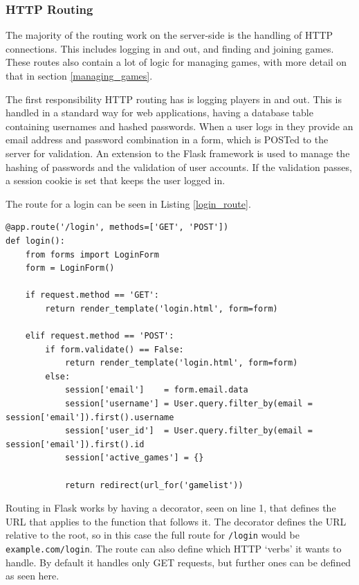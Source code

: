\subsubsection{HTTP Routing}
The majority of the routing work on the server-side is the handling of HTTP connections. This includes logging in and out, and finding and joining games. These routes also contain a lot of logic for managing games, with more detail on that in section \ref{managing_games}.

The first responsibility HTTP routing has is logging players in and out. This is handled in a standard way for web applications, having a database table containing usernames and hashed passwords. When a user logs in they provide an email address and password combination in a form, which is POSTed to the server for validation. An extension to the Flask framework is used to manage the hashing of passwords and the validation of user accounts. If the validation passes, a session cookie is set that keeps the user logged in.

The route for a login can be seen in Listing \ref{login_route}.

\noindent
\begin{minipage}{\linewidth}
\begin{lstlisting}[style=py, caption={Route for handling logins on the server-side.}, label=login_route]
@app.route('/login', methods=['GET', 'POST'])
def login():
    from forms import LoginForm
    form = LoginForm()

    if request.method == 'GET':
        return render_template('login.html', form=form)

    elif request.method == 'POST':
        if form.validate() == False:
            return render_template('login.html', form=form)
        else:
            session['email']    = form.email.data
            session['username'] = User.query.filter_by(email = session['email']).first().username
            session['user_id']  = User.query.filter_by(email = session['email']).first().id
            session['active_games'] = {}

            return redirect(url_for('gamelist'))
\end{lstlisting}
\end{minipage}

Routing in Flask works by having a decorator, seen on line 1, that defines the URL that applies to the function that follows it. The decorator defines the URL relative to the root, so in this case the full route for \texttt{/login} would be \texttt{example.com/login}. The route can also define which HTTP `verbs' it wants to handle. By default it handles only GET requests, but further ones can be defined as seen here.

